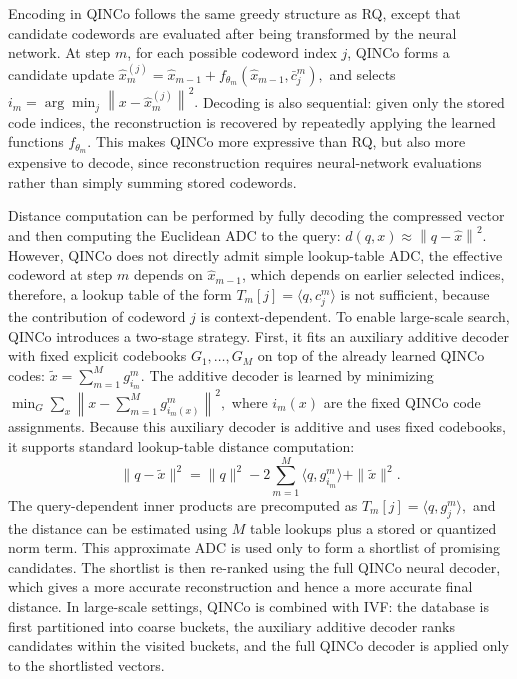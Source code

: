 \documentclass[sigconf]{acmart}
\begin{document}
Encoding in QINCo follows the same greedy structure as RQ, except that candidate codewords are evaluated after being transformed by the neural network. 
At step $m$, for each possible codeword index $j$, QINCo forms a candidate update
\(
\hat{x}_{m}^{(j)}
=
\hat{x}_{m-1}
+
f_{\theta_m}
\left(
\hat{x}_{m-1},\bar{c}^m_j
\right),
\)
and selects
\(
i_m
=
\arg\min_{j}
\left\|
x-\hat{x}_{m}^{(j)}
\right\|^2.
\)
Decoding is also sequential: given only the stored code indices, the reconstruction is recovered by repeatedly applying the learned functions $f_{\theta_m}$. 
This makes QINCo more expressive than RQ, but also more expensive to decode, since reconstruction requires neural-network evaluations rather than simply summing stored codewords.

Distance computation can be performed by fully decoding the compressed vector and then computing the Euclidean ADC to the query:
\(
d(q,x)
\approx
\left\|
q-\hat{x}
\right\|^2.
\)
However, QINCo does not directly admit simple lookup-table ADC, the effective codeword at step $m$ depends on $\hat{x}_{m-1}$, which depends on earlier selected indices, 
therefore, a lookup table of the form
\(
T_m[j] = \langle q, c^m_j\rangle
\)
is not sufficient, because the contribution of codeword $j$ is context-dependent.
To enable large-scale search, QINCo introduces a two-stage strategy. 
First, it fits an auxiliary additive decoder with fixed explicit codebooks $G_1,\ldots,G_M$ on top of the already learned QINCo codes:
\(
\tilde{x}
=
\sum_{m=1}^{M} g^m_{i_m}.
\)
The additive decoder is learned by minimizing
\(
\min_G
\sum_x
\left\|
x-
\sum_{m=1}^{M} g^m_{i_m(x)}
\right\|^2,
\)
where $i_m(x)$ are the fixed QINCo code assignments. 
Because this auxiliary decoder is additive and uses fixed codebooks, it supports standard lookup-table distance computation:
\[
\|q-\tilde{x}\|^2
=
\|q\|^2
-
2\sum_{m=1}^{M}\langle q,g^m_{i_m}\rangle
+
\|\tilde{x}\|^2.
\]
The query-dependent inner products are precomputed as
\(
T_m[j]
=
\langle q,g^m_j\rangle,
\)
and the distance can be estimated using $M$ table lookups plus a stored or quantized norm term. 
This approximate ADC is used only to form a shortlist of promising candidates. 
The shortlist is then re-ranked using the full QINCo neural decoder, which gives a more accurate reconstruction and hence a more accurate final distance. 
In large-scale settings, QINCo is combined with IVF: the database is first partitioned into coarse buckets, the auxiliary additive decoder ranks candidates within the visited buckets, and the full QINCo decoder is applied only to the shortlisted vectors.
\end{document}
